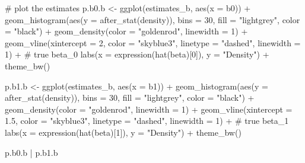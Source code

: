 \documentclass[
]{article}
\newenvironment{Shaded}{\begin{snugshade}}{\end{snugshade}}
\newcommand{\AttributeTok}[1]{\textcolor[rgb]{0.40,0.45,0.13}{#1}}
\newcommand{\CommentTok}[1]{\textcolor[rgb]{0.37,0.37,0.37}{#1}}
\newcommand{\DecValTok}[1]{\textcolor[rgb]{0.68,0.00,0.00}{#1}}
\newcommand{\FloatTok}[1]{\textcolor[rgb]{0.68,0.00,0.00}{#1}}
\newcommand{\FunctionTok}[1]{\textcolor[rgb]{0.28,0.35,0.67}{#1}}
\newcommand{\NormalTok}[1]{\textcolor[rgb]{0.00,0.23,0.31}{#1}}
\newcommand{\OtherTok}[1]{\textcolor[rgb]{0.00,0.23,0.31}{#1}}
\newcommand{\SpecialCharTok}[1]{\textcolor[rgb]{0.37,0.37,0.37}{#1}}
\newcommand{\StringTok}[1]{\textcolor[rgb]{0.13,0.47,0.30}{#1}}
\begin{document}
\begin{Shaded}
\begin{Highlighting}[numbers=left,,]
\CommentTok{\# plot the estimates}
\NormalTok{p.b0.b }\OtherTok{\textless{}{-}} \FunctionTok{ggplot}\NormalTok{(estimates\_b, }\FunctionTok{aes}\NormalTok{(}\AttributeTok{x =}\NormalTok{ b0)) }\SpecialCharTok{+}
  \FunctionTok{geom\_histogram}\NormalTok{(}\FunctionTok{aes}\NormalTok{(}\AttributeTok{y =} \FunctionTok{after\_stat}\NormalTok{(density)), }\AttributeTok{bins =} \DecValTok{30}\NormalTok{,}
                 \AttributeTok{fill =} \StringTok{"lightgrey"}\NormalTok{, }\AttributeTok{color =} \StringTok{"black"}\NormalTok{) }\SpecialCharTok{+}
  \FunctionTok{geom\_density}\NormalTok{(}\AttributeTok{color =} \StringTok{"goldenrod"}\NormalTok{, }\AttributeTok{linewidth =} \DecValTok{1}\NormalTok{) }\SpecialCharTok{+}
  \FunctionTok{geom\_vline}\NormalTok{(}\AttributeTok{xintercept =} \DecValTok{2}\NormalTok{, }\AttributeTok{color =} \StringTok{"skyblue3"}\NormalTok{,}
             \AttributeTok{linetype =} \StringTok{"dashed"}\NormalTok{, }\AttributeTok{linewidth =} \DecValTok{1}\NormalTok{) }\SpecialCharTok{+}       \CommentTok{\# true beta\_0}
  \FunctionTok{labs}\NormalTok{(}\AttributeTok{x =} \FunctionTok{expression}\NormalTok{(}\FunctionTok{hat}\NormalTok{(beta)[}\DecValTok{0}\NormalTok{]), }\AttributeTok{y =} \StringTok{"Density"}\NormalTok{) }\SpecialCharTok{+}
  \FunctionTok{theme\_bw}\NormalTok{()}

\NormalTok{p.b1.b }\OtherTok{\textless{}{-}} \FunctionTok{ggplot}\NormalTok{(estimates\_b, }\FunctionTok{aes}\NormalTok{(}\AttributeTok{x =}\NormalTok{ b1)) }\SpecialCharTok{+}
  \FunctionTok{geom\_histogram}\NormalTok{(}\FunctionTok{aes}\NormalTok{(}\AttributeTok{y =} \FunctionTok{after\_stat}\NormalTok{(density)), }\AttributeTok{bins =} \DecValTok{30}\NormalTok{,}
                 \AttributeTok{fill =} \StringTok{"lightgrey"}\NormalTok{, }\AttributeTok{color =} \StringTok{"black"}\NormalTok{) }\SpecialCharTok{+}
  \FunctionTok{geom\_density}\NormalTok{(}\AttributeTok{color =} \StringTok{"goldenrod"}\NormalTok{, }\AttributeTok{linewidth =} \DecValTok{1}\NormalTok{) }\SpecialCharTok{+}
  \FunctionTok{geom\_vline}\NormalTok{(}\AttributeTok{xintercept =} \FloatTok{1.5}\NormalTok{, }\AttributeTok{color =} \StringTok{"skyblue3"}\NormalTok{,}
             \AttributeTok{linetype =} \StringTok{"dashed"}\NormalTok{, }\AttributeTok{linewidth =} \DecValTok{1}\NormalTok{) }\SpecialCharTok{+}       \CommentTok{\# true beta\_1}
  \FunctionTok{labs}\NormalTok{(}\AttributeTok{x =} \FunctionTok{expression}\NormalTok{(}\FunctionTok{hat}\NormalTok{(beta)[}\DecValTok{1}\NormalTok{]), }\AttributeTok{y =} \StringTok{"Density"}\NormalTok{) }\SpecialCharTok{+}
  \FunctionTok{theme\_bw}\NormalTok{()}

\NormalTok{p.b0.b }\SpecialCharTok{|}\NormalTok{ p.b1.b}
\end{Highlighting}
\end{Shaded}
\end{document}
